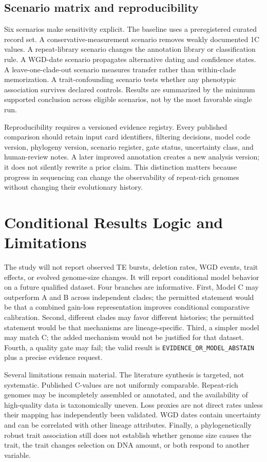 \documentclass[conference]{IEEEtran}
\newcommand{\state}[1]{\texttt{#1}}
\begin{document}
\subsection{Scenario matrix and reproducibility}

Six scenarios make sensitivity explicit. The baseline uses a preregistered curated record set. A conservative-measurement scenario removes weakly documented 1C values. A repeat-library scenario changes the annotation library or classification rule. A WGD-date scenario propagates alternative dating and confidence states. A leave-one-clade-out scenario measures transfer rather than within-clade memorization. A trait-confounding scenario tests whether any phenotypic association survives declared controls. Results are summarized by the minimum supported conclusion across eligible scenarios, not by the most favorable single run.

Reproducibility requires a versioned evidence registry. Every published comparison should retain input card identifiers, filtering decisions, model code version, phylogeny version, scenario register, gate status, uncertainty class, and human-review notes. A later improved annotation creates a new analysis version; it does not silently rewrite a prior claim. This distinction matters because progress in sequencing can change the observability of repeat-rich genomes without changing their evolutionary history.

\section{Conditional Results Logic and Limitations}

The study will not report observed TE bursts, deletion rates, WGD events, trait effects, or evolved genome-size changes. It will report conditional model behavior on a future qualified dataset. Four branches are informative. First, Model C may outperform A and B across independent clades; the permitted statement would be that a combined gain-loss representation improves conditional comparative calibration. Second, different clades may favor different histories; the permitted statement would be that mechanisms are lineage-specific. Third, a simpler model may match C; the added mechanism would not be justified for that dataset. Fourth, a quality gate may fail; the valid result is \state{EVIDENCE\_OR\_MODEL\_ABSTAIN} plus a precise evidence request.

Several limitations remain material. The literature synthesis is targeted, not systematic. Published C-values are not uniformly comparable. Repeat-rich genomes may be incompletely assembled or annotated, and the availability of high-quality data is taxonomically uneven. Loss proxies are not direct rates unless their mapping has independently been validated. WGD dates contain uncertainty and can be correlated with other lineage attributes. Finally, a phylogenetically robust trait association still does not establish whether genome size causes the trait, the trait changes selection on DNA amount, or both respond to another variable.
\end{document}
